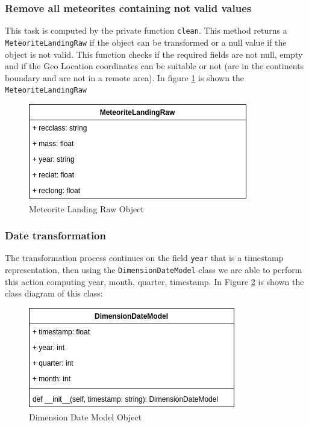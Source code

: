 \documentclass[conference]{IEEEtran}
\begin{document}
	\subsubsection{Remove all meteorites containing not valid values}
	This task is computed by the private function \texttt{clean}. This method returns a \texttt{MeteoriteLandingRaw} if the object can be transformed or a null value if the object is not valid. This function checks if the required fields are not null, empty and if the Geo Location coordinates can be suitable or not (are in the continents boundary and are not in a remote area).
	In figure \ref{fig:MeteoriteLandingRaw} is shown the \texttt{MeteoriteLandingRaw}
	\begin{figure}[htpb]
		\centering
		\includegraphics[width=\columnwidth]{images/meteorite_landing_raw.png}
		\caption{Meteorite Landing Raw Object}
		\label{fig:MeteoriteLandingRaw}
	\end{figure}
	
	
	\subsubsection{Date transformation}
	The transformation process continues on the field \texttt{year} that is a timestamp representation, then using the \texttt{DimensionDateModel} class we are able to perform this action computing year, month, quarter, timestamp. In Figure \ref{fig:DimensionDateModel} is shown the class diagram of this class:
	\begin{figure}[htpb]
		\centering
		\includegraphics[width=\columnwidth]{images/dimension_date_model.png}
		\caption{Dimension Date Model Object}
		\label{fig:DimensionDateModel}
	\end{figure}
	
\end{document}
